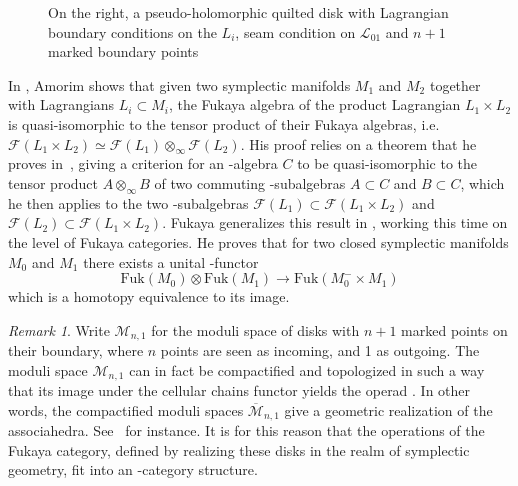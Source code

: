 \documentclass[twoside, 12pt]{amsart}
\theoremstyle{remark}
\newtheorem{remark}[definition]{\sc Remark}
\begin{document}
\begin{figure}[h]
\begin{subfigure}{0.4\textwidth}

\end{subfigure}

\caption{ On the right, a pseudo-holomorphic quilted disk with Lagrangian boundary conditions on the $L_i$, seam condition on $\mathcal{L}_{01}$ and $n+1$ marked boundary points} \label{fig:pseudo-hol-disk-bord-lagrang}
\end{figure}


In \cite{amorim-lagrangian}, Amorim shows that given two symplectic manifolds $M_1$ and $M_2$ together with Lagrangians $L_i \subset M_i$, the Fukaya algebra of the product Lagrangian $L_1 \times L_2$ is quasi-isomorphic to the tensor product of their Fukaya algebras, i.e. $\mathcal{F}(L_1 \times L_2) \simeq \mathcal{F}(L_1) \otimes_\infty \mathcal{F}(L_2)$. His proof relies on a theorem that he proves in~\cite{amorim-tensor}, giving a criterion for an \Ainf -algebra $C$ to be quasi-isomorphic to the tensor product $A \otimes_\infty B$ of two commuting \Ainf -subalgebras $A \subset C$ and $B \subset C$, which he then applies to the two \Ainf -subalgebras $\mathcal{F}(L_1) \subset \mathcal{F}(L_1 \times L_2)$ and $\mathcal{F}(L_2) \subset \mathcal{F}(L_1 \times L_2)$.
Fukaya generalizes this result in \cite{fukaya-unobstructed}, working this time on the level of Fukaya categories. He proves that for two closed symplectic manifolds $M_0$ and $M_1$ there exists a unital \Ainf -functor
\[ \mathrm{Fuk}(M_0) \otimes \mathrm{Fuk}(M_1) \longrightarrow \mathrm{Fuk}(M_0^- \times M_1) \]
which is a homotopy equivalence to its image. 

\begin{remark}
Write $\mathcal{M}_{n,1}$ for the moduli space of disks with $n+1$ marked points on their boundary, where $n$ points are seen as incoming, and 1 as outgoing. The moduli space $\mathcal{M}_{n,1}$ can in fact be compactified and topologized in such a way that its image under the cellular chains functor yields the operad \Ainf. In other words, the compactified moduli spaces $\overline{\mathcal{M}}_{n,1}$ give a geometric realization of the associahedra. See~\cite{Seidel08} for instance. It is for this reason that the operations of the Fukaya category, defined by realizing these disks in the realm of symplectic geometry, fit into an \Ainf -category structure.
\end{remark}
\end{document}
